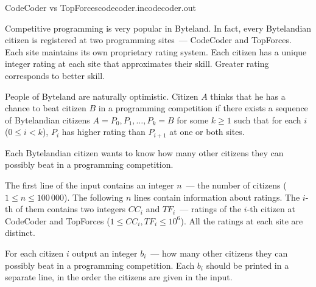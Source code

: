 \begin{problem}{CodeCoder vs TopForces}{codecoder.in}{codecoder.out}{\timeLimit}


Competitive programming is very popular in Byteland. 
In fact, every Bytelandian citizen is registered at two programming sites~---
CodeCoder and TopForces. 
Each site maintains its own proprietary rating system. 
Each citizen has a unique integer rating at each site that approximates their skill.
Greater rating corresponds to better skill.

People of Byteland are naturally optimistic. 
Citizen $A$ thinks that he has a chance to beat citizen $B$ in a programming competition
if there exists a sequence of Bytelandian citizens $A = P_0, P_1, \ldots, P_k = B$
for some $k \geq 1$ such that for each $i$ ($0 \leq i < k$), $P_i$ has higher rating
than $P_{i + 1}$ at one or both sites.

Each Bytelandian citizen wants to know how many other citizens they can possibly beat 
in a programming competition.

\InputFile

The first line of the input contains an integer $n$~--- the number of
citizens ($1 \leq n \leq 100\,000$).
The following $n$ lines contain information about ratings. The $i$-th of them
contains two integers $CC_i$ and $TF_i$~--- ratings of the $i$-th 
citizen at CodeCoder and TopForces
($1 \leq CC_i, TF_i \leq 10^6$).
All the ratings at each site are distinct.

\OutputFile

For each citizen $i$ output an integer $b_i$~---
how many other citizens they can possibly beat in a programming competition.
Each $b_i$ should be printed in a separate line, in the order
the citizens are given in the input.

\Example

\begin{example}
%
\end{example}

\end{problem}
